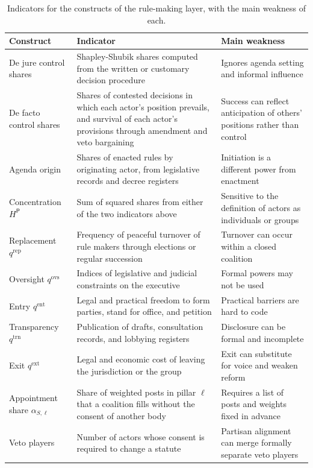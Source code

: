 \documentclass[11pt,letterpaper]{article}
\theoremstyle{definition}
\theoremstyle{remark}
\newcommand{\pP}{\mathsf{P}}
\begin{document}
\begin{table}[tbp]
\centering
\small
\caption{Indicators for the constructs of the rule-making layer, with the main weakness of each.}
\label{tab:indicators}
\begin{tabularx}{\textwidth}{@{}L{2.6cm}YY@{}}
\toprule
Construct & Indicator & Main weakness \\
\midrule
De jure control shares & Shapley-Shubik shares computed from the written or customary decision procedure & Ignores agenda setting and informal influence \\
De facto control shares & Shares of contested decisions in which each actor's position prevails, and survival of each actor's provisions through amendment and veto bargaining & Success can reflect anticipation of others' positions rather than control \\
Agenda origin & Shares of enacted rules by originating actor, from legislative records and decree registers & Initiation is a different power from enactment \\
Concentration $H^{\pP}$ & Sum of squared shares from either of the two indicators above & Sensitive to the definition of actors as individuals or groups \\
Replacement $q^{\mathrm{rep}}$ & Frequency of peaceful turnover of rule makers through elections or regular succession & Turnover can occur within a closed coalition \\
Oversight $q^{\mathrm{ovs}}$ & Indices of legislative and judicial constraints on the executive & Formal powers may not be used \\
Entry $q^{\mathrm{ent}}$ & Legal and practical freedom to form parties, stand for office, and petition & Practical barriers are hard to code \\
Transparency $q^{\mathrm{trn}}$ & Publication of drafts, consultation records, and lobbying registers & Disclosure can be formal and incomplete \\
Exit $q^{\mathrm{ext}}$ & Legal and economic cost of leaving the jurisdiction or the group & Exit can substitute for voice and weaken reform \\
Appointment share $\alpha_{S,\ell}$ & Share of weighted posts in pillar $\ell$ that a coalition fills without the consent of another body & Requires a list of posts and weights fixed in advance \\
Veto players & Number of actors whose consent is required to change a statute & Partisan alignment can merge formally separate veto players \\
\bottomrule
\end{tabularx}
\end{table}
\end{document}
